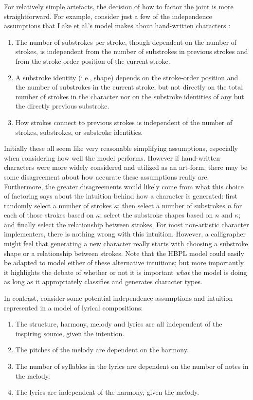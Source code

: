 \documentclass[phd,electronic,oneside,twosidetoc,letterpaper,chaptercenter,parttop,lol,lof,lot]{byumsphd}
\begin{document}
For relatively simple artefacts, the decision of how to factor the joint is more straightforward. For example, consider just a few of the independence assumptions that Lake et al.'s model makes about hand-written characters \cite{lake2015human}:

\begin{enumerate}  
\item The number of substrokes per stroke, though dependent on the number of strokes, is independent from the number of substrokes in previous strokes and from the stroke-order position of the current stroke.
\item A substroke identity (i.e., shape) depends on the stroke-order position and the number of substrokes in the current stroke, but not directly on the total number of strokes in the character nor on the substroke identities of any but the directly previous substroke.
\item How strokes connect to previous strokes is independent of the number of strokes, substrokes, or substroke identities.
\end{enumerate}

\noindent Initially these all seem like very reasonable simplifying assumptions, especially when considering how well the model performs. However if hand-written characters were more widely considered and utilized as an art-form, there may be some disagreement about how accurate these assumptions really are. Furthermore, the greater disagreements would likely come from what this choice of factoring says about the intuition behind how a character is generated: first randomly select a number of strokes $\kappa$; then select a number of substrokes $n$ for each of those strokes based on $\kappa$; select the substroke shapes based on $n$ and $\kappa$; and finally select the relationship between strokes. For most non-artistic character implementers, there is nothing wrong with this intuition. However, a calligrapher might feel that generating a new character really starts with choosing a substroke shape or a relationship between strokes. Note that the HBPL model could easily be adapted to model either of these alternative intuitions; but more importantly it highlights the debate of whether or not it is important \emph{what} the model is doing as long as it appropriately classifies and generates character types.

In contrast, consider some potential independence assumptions and intuition represented in a model of lyrical compositions:

\begin{enumerate}  
\item The structure, harmony, melody and lyrics are all independent of the inspiring source, given the intention.
\item The pitches of the melody are dependent on the harmony.
\item The number of syllables in the lyrics are dependent on the number of notes in the melody.
\item The lyrics are independent of the harmony, given the melody.
\end{enumerate}
\end{document}
